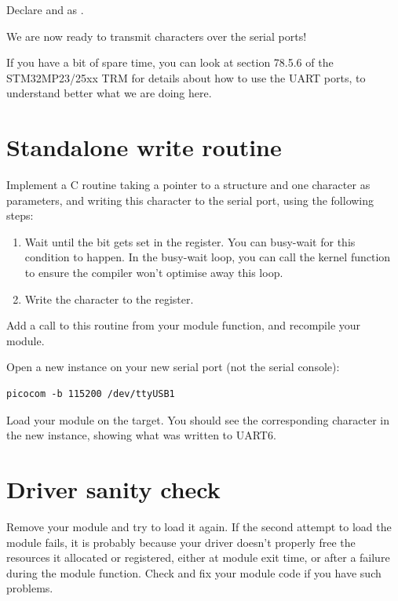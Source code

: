 Declare  and  as .

We are now ready to transmit characters over the serial ports!

If you have a bit of spare time, you can look at section 78.5.6 of the
STM32MP23/25xx TRM for details about how to use the UART ports, to understand
better what we are doing here.

\section{Standalone write routine}

Implement a C routine taking a pointer to a 
structure and one character as parameters, and writing
this character to the serial port, using the following steps:

\begin{enumerate}
\item Wait until the  bit gets set in the
   register.  You can busy-wait for this condition to happen.
  In the busy-wait loop, you can call the  kernel function
  to ensure the compiler won't optimise away this loop.
\item Write the character to the  register.
\end{enumerate}

Add a call to this routine from your module  function,
and recompile your module.

Open a new  instance on your new serial port (not the
serial console):

\begin{verbatim}
picocom -b 115200 /dev/ttyUSB1
\end{verbatim}

Load your module on the target. You should see the
corresponding character in the new  instance,
showing what was written to UART6.

\section{Driver sanity check}

Remove your module and try to load it again. If the second attempt to
load the module fails, it is probably because your driver doesn't
properly free the resources it allocated or registered, either at module
exit time, or after a failure during the module  function. Check
and fix your module code if you have such problems.
